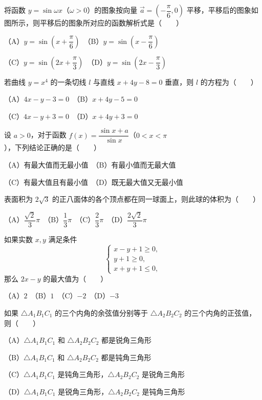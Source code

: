 \begin{question}
将函数 $y=\sin\omega x$（$\omega>0$）的图象按向量 $\vec a=\left(-\dfrac{\pi}{6},0\right)$ 平移，平移后的图象如图所示，则平移后的图象所对应的函数解析式是\mbox{（　　）}
\nopagebreak[4]
\begin{center}\end{center}
\nopagebreak[4]
（A）$y=\sin\left(x+\dfrac{\pi}{6}\right)$　（B）$y=\sin\left(x-\dfrac{\pi}{6}\right)$

（C）$y=\sin\left(2x+\dfrac{\pi}{3}\right)$　（D）$y=\sin\left(2x-\dfrac{\pi}{3}\right)$

\end{question}
\begin{question}
若曲线 $y=x^4$ 的一条切线 $l$ 与直线 $x+4y-8=0$ 垂直，则 $l$ 的方程为\mbox{（　　）}

（A）$4x-y-3=0$　（B）$x+4y-5=0$

（C）$4x-y+3=0$　（D）$x+4y+3=0$

\end{question}
\begin{question}
设 $a>0$，对于函数 $f(x)=\dfrac{\sin x+a}{\sin x}$（$0<x<\pi$），下列结论正确的是\mbox{（　　）}

（A）有最大值而无最小值　（B）有最小值而无最大值

（C）有最大值且有最小值　（D）既无最大值又无最小值

\end{question}
\begin{question}
表面积为 $2\sqrt{3}$ 的正八面体的各个顶点都在同一球面上，则此球的体积为\mbox{（　　）}

（A）$\dfrac{\sqrt{2}}{3}\pi$　（B）$\dfrac{1}{3}\pi$　（C）$\dfrac{2}{3}\pi$　（D）$\dfrac{2\sqrt{2}}{3}\pi$

\end{question}
\begin{question}
如果实数 $x,y$ 满足条件
\nopagebreak[4]
\[
\begin{cases}
x-y+1\geqslant0,\\
y+1\geqslant0,\\
x+y+1\leqslant0,
\end{cases}
\]
那么 $2x-y$ 的最大值为\mbox{（　　）}

（A）$2$　（B）$1$　（C）$-2$　（D）$-3$

\end{question}
\begin{question}
如果 $\triangle A_1B_1C_1$ 的三个内角的余弦值分别等于 $\triangle A_2B_2C_2$ 的三个内角的正弦值，则\mbox{（　　）}

（A）$\triangle A_1B_1C_1$ 和 $\triangle A_2B_2C_2$ 都是锐角三角形

（B）$\triangle A_1B_1C_1$ 和 $\triangle A_2B_2C_2$ 都是钝角三角形

（C）$\triangle A_1B_1C_1$ 是钝角三角形，$\triangle A_2B_2C_2$ 是锐角三角形

（D）$\triangle A_1B_1C_1$ 是锐角三角形，$\triangle A_2B_2C_2$ 是钝角三角形

\end{question}
